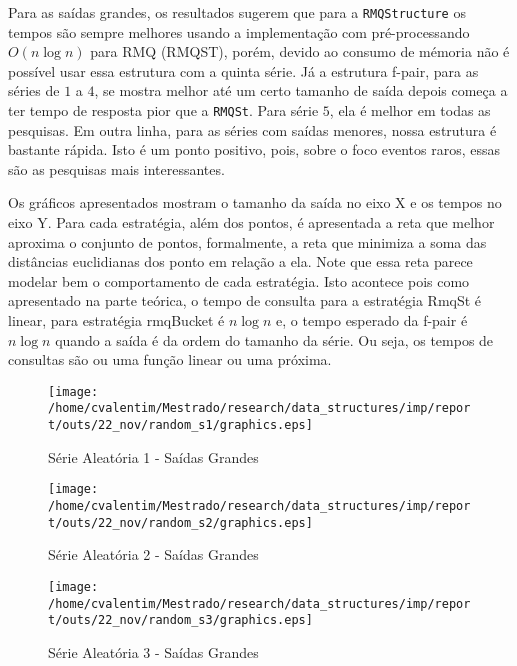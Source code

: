 \documentclass[12pt]{article}
\begin{document}
Para as saídas grandes, os resultados sugerem que para a \verb|RMQStructure| os tempos são sempre melhores usando a implementação
com pré-processando $O(n \log n)$ para RMQ (RMQST), porém, devido ao consumo de mémoria não é possível
usar essa estrutura com a quinta série. Já a estrutura f-pair, para as séries de $1$ a $4$, se mostra melhor
até um certo tamanho de saída depois começa a ter tempo de resposta pior que a \verb|RMQSt|. Para série $5$,
ela é melhor em todas as pesquisas. Em outra linha, para as séries com saídas menores, nossa estrutura é bastante rápida.
Isto é um ponto positivo, pois, sobre o foco eventos raros, essas são as pesquisas mais interessantes.


Os gráficos apresentados mostram o tamanho da saída no eixo X e os tempos no eixo Y. Para cada estratégia,
além dos pontos, é apresentada a reta que melhor aproxima o conjunto de pontos, formalmente, a reta
que minimiza a soma das distâncias euclidianas dos ponto em relação a ela. Note que essa reta parece modelar
bem o comportamento de cada estratégia. Isto acontece pois como apresentado na parte teórica, o tempo de consulta
para a estratégia RmqSt é linear, para estratégia rmqBucket é $n\log n$ e, o tempo esperado da f-pair é $n\log n$
quando a saída é da ordem do tamanho da série. Ou seja, os tempos de consultas são ou uma função linear ou uma próxima. 

\begin{figure}
\begin{center}
\texttt{[image: /home/cvalentim/Mestrado/research/data\_structures/imp/report/outs/22\_nov/random\_s1/graphics.eps]}
\caption{Série Aleatória 1 - Saídas Grandes}
\end{center}
\end{figure}

\begin{figure}
\begin{center}
\texttt{[image: /home/cvalentim/Mestrado/research/data\_structures/imp/report/outs/22\_nov/random\_s2/graphics.eps]}
\caption{Série Aleatória 2 - Saídas Grandes}
\end{center}
\end{figure}

\begin{figure}
\begin{center}
\texttt{[image: /home/cvalentim/Mestrado/research/data\_structures/imp/report/outs/22\_nov/random\_s3/graphics.eps]}
\caption{Série Aleatória 3 - Saídas Grandes}
\end{center}
\end{figure}
\end{document}
